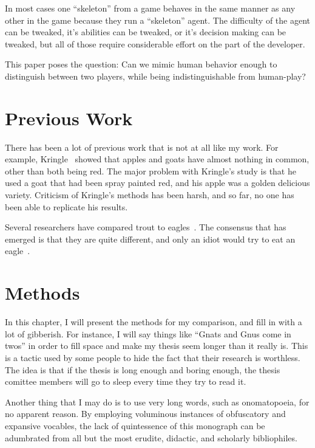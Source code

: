 \documentclass[12pt]{thesis}
\begin{document}
In most cases one ``skeleton'' from a game behaves in the same manner as any 
other in the game because they run a ``skeleton'' agent. The difficulty of the 
agent can be tweaked, it's abilities can be tweaked, or it's decision making 
can be tweaked, but all of those require considerable effort on the part of the 
developer.

This paper poses the question: Can we mimic human behavior enough to 
distinguish between two players, while being indistinguishable from human-play?

\chapter{Previous Work}


There has been a lot of previous work that is not at all like my work.
For example,
\ifthesiscitations
{} %
\else
Kringle~\cite{Kringle} %
\fi
showed that apples and goats have almost
nothing in common, other than both being red.  The major problem with
Kringle's study is that he used a goat that had been spray painted
red, and his apple was a golden delicious variety.  Criticism of
Kringle's methods has been harsh, and so far, no one has been able to
replicate his results.

Several researchers have compared trout to
eagles~\cite{Simmons,Sheppard}.  The consensus that has emerged is
that they are quite different, and only an idiot would try to eat an
eagle~\cite{Idiot}.

\chapter{Methods}
In this chapter, I will present the methods for my comparison, and
fill in with a lot of gibberish.  For instance, I will say things like
``Gnats and Gnus come in twos'' in order to fill space and make my
thesis seem longer than it really is.  This is a tactic used by some
people to hide the fact that their research is worthless.  The idea is
that if the thesis is long enough and boring enough, the thesis
comittee members will go to sleep every time they try to read it.

Another thing that I may do is to use very long words, such as
onomatopoeia, for no apparent reason.  By employing voluminous
instances of obfuscatory and expansive vocables, the lack of
quintessence of this monograph can be adumbrated from all but
the most erudite, didactic, and scholarly bibliophiles.
\end{document}
